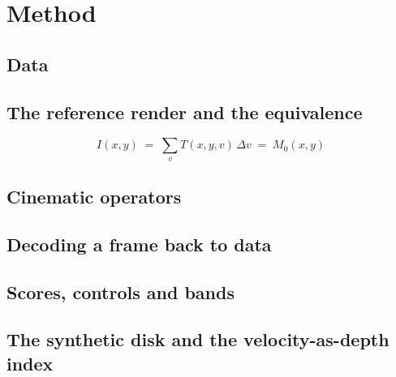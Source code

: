 \section{Method}
\label{sec:method}

\subsection{Data}

\subsection{The reference render and the equivalence}
\begin{equation}
  I(x,y) \;=\; \sum_{v} T(x,y,v)\,\Delta v \;=\; M_0(x,y)
  \label{eq:equivalence}
\end{equation}

\subsection{Cinematic operators}

\subsection{Decoding a frame back to data}

\subsection{Scores, controls and bands}

\subsection{The synthetic disk and the velocity-as-depth index}
